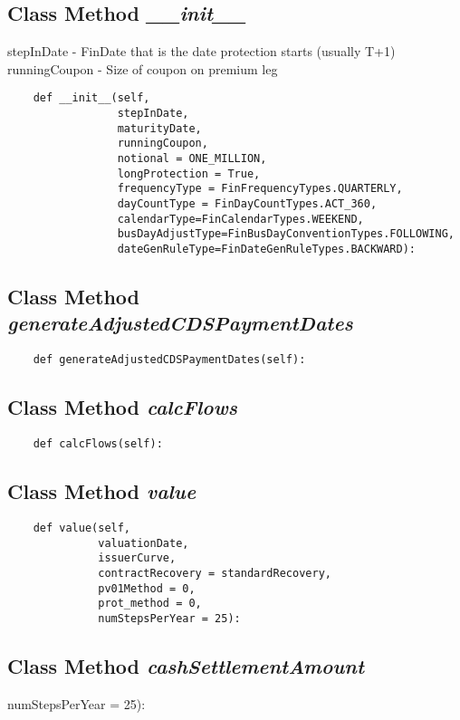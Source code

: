 \documentclass[twoside,11pt]{book}
\begin{document}
\subsection{Class Method {\it \_\_init\_\_}}
stepInDate - FinDate that is the date protection starts (usually T+1) runningCoupon - Size of coupon on premium leg 

\begin{lstlisting}
    def __init__(self,
                 stepInDate,
                 maturityDate,
                 runningCoupon,
                 notional = ONE_MILLION,
                 longProtection = True,
                 frequencyType = FinFrequencyTypes.QUARTERLY,
                 dayCountType = FinDayCountTypes.ACT_360,
                 calendarType=FinCalendarTypes.WEEKEND,
                 busDayAdjustType=FinBusDayConventionTypes.FOLLOWING,
                 dateGenRuleType=FinDateGenRuleTypes.BACKWARD):
\end{lstlisting}

\subsection{Class Method {\it generateAdjustedCDSPaymentDates}}


\begin{lstlisting}
    def generateAdjustedCDSPaymentDates(self):
\end{lstlisting}

\subsection{Class Method {\it calcFlows}}


\begin{lstlisting}
    def calcFlows(self):
\end{lstlisting}

\subsection{Class Method {\it value}}


\begin{lstlisting}
    def value(self,
              valuationDate,
              issuerCurve,
              contractRecovery = standardRecovery,
              pv01Method = 0,
              prot_method = 0,
              numStepsPerYear = 25):
\end{lstlisting}

\subsection{Class Method {\it cashSettlementAmount}}
numStepsPerYear = 25):
\end{document}
